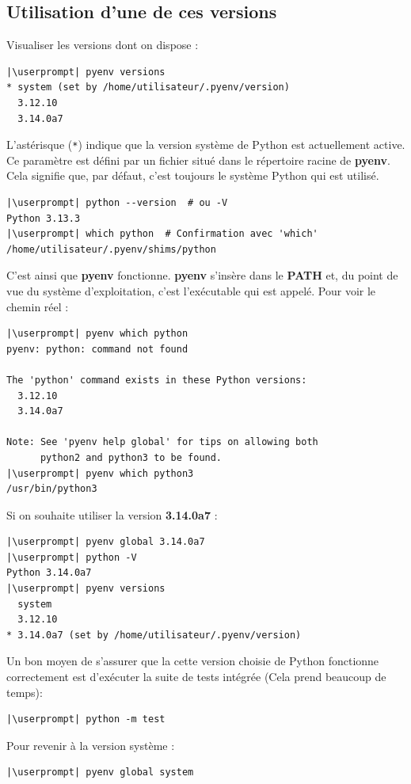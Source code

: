 \subsection*{Utilisation d'une de ces versions}
Visualiser les versions dont on dispose :
\begin{lstlisting}[style=bash]
|\userprompt| pyenv versions
* system (set by /home/utilisateur/.pyenv/version)
  3.12.10
  3.14.0a7
\end{lstlisting}

L'astérisque (\texttt{*}) indique que la version système de Python est actuellement active. Ce paramètre est défini par un fichier situé dans le répertoire racine de \textbf{pyenv}. Cela signifie que, par défaut, c'est toujours le système Python qui est utilisé.
\begin{lstlisting}[style=bash]
|\userprompt| python --version  # ou -V
Python 3.13.3
|\userprompt| which python  # Confirmation avec 'which'
/home/utilisateur/.pyenv/shims/python
\end{lstlisting}

C'est ainsi que \textbf{pyenv} fonctionne. \textbf{pyenv} s'insère dans le \textbf{PATH} et, du point de vue du système d'exploitation, c'est l'exécutable qui est appelé. Pour voir le chemin réel :
\begin{lstlisting}[style=bash]
|\userprompt| pyenv which python
pyenv: python: command not found

The 'python' command exists in these Python versions:
  3.12.10
  3.14.0a7

Note: See 'pyenv help global' for tips on allowing both
      python2 and python3 to be found.
|\userprompt| pyenv which python3
/usr/bin/python3
\end{lstlisting}

Si on souhaite utiliser la version \textbf{3.14.0a7} :
\begin{lstlisting}[style=bash]
|\userprompt| pyenv global 3.14.0a7
|\userprompt| python -V
Python 3.14.0a7
|\userprompt| pyenv versions
  system
  3.12.10
* 3.14.0a7 (set by /home/utilisateur/.pyenv/version)
\end{lstlisting}

Un bon moyen de s'assurer que la cette version choisie de Python fonctionne correctement est d'exécuter la suite de tests intégrée (Cela prend beaucoup de temps):
\begin{lstlisting}[style=bash]
|\userprompt| python -m test
\end{lstlisting}

Pour revenir à la version système :
\begin{lstlisting}[style=bash]
|\userprompt| pyenv global system
\end{lstlisting}

